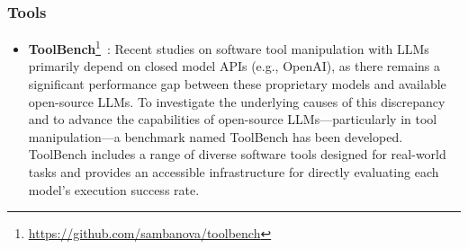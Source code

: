 \subsubsection{Tools}
\begin{itemize}[leftmargin=*]
    \item \textbf{ToolBench}\footnote{\href{https://github.com/sambanova/toolbench}{https://github.com/sambanova/toolbench}}~\cite{shen2023taskbench}: Recent studies on software tool manipulation with LLMs primarily depend on closed model APIs (e.g., OpenAI), as there remains a significant performance gap between these proprietary models and available open-source LLMs. To investigate the underlying causes of this discrepancy and to advance the capabilities of open-source LLMs—particularly in tool manipulation—a benchmark named ToolBench has been developed. ToolBench includes a range of diverse software tools designed for real-world tasks and provides an accessible infrastructure for directly evaluating each model’s execution success rate.
\end{itemize}